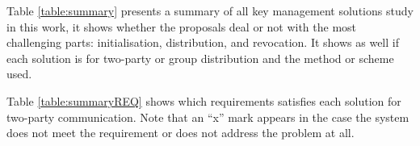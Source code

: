 Table \ref{table:summary} presents a summary of all key management solutions study in this work, it shows whether the proposals deal or not with the most challenging parts: initialisation, distribution, and revocation. It shows as well if each solution is for two-party or group distribution and the method or scheme used.  

Table \ref{table:summaryREQ} shows which requirements satisfies each solution for two-party communication. Note that an ``x'' mark appears in the case the system does not meet the requirement or does not address the problem at all.    


\begin{landscape}


\end{landscape}
